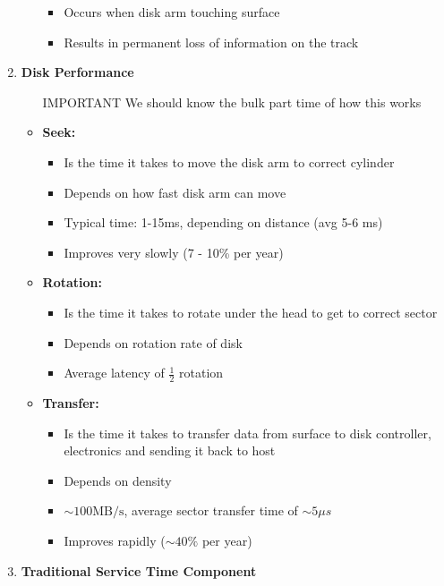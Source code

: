 \documentclass[12pt]{article}
\begin{document}
\begin{enumerate}[1.]
\begin{itemize}
        \begin{itemize}
            \item Occurs when disk arm touching surface
            \item Results in permanent loss of information on the track
        \end{itemize}
    \end{itemize}
    \item \textbf{Disk Performance}
    \begin{itemize}
        \item [\color{red}IMPORTANT\color{black}] We should know the bulk part time of how this works
        \item \textbf{Seek:}
        \begin{itemize}
            \item Is the time it takes to move the disk arm to correct cylinder
            \item Depends on how fast disk arm can move
            \item Typical time: 1-15ms, depending on distance (avg 5-6 ms)
            \item Improves very slowly (7 - 10\% per year)
        \end{itemize}
        \item \textbf{Rotation:}
        \begin{itemize}
            \item Is the time it takes to rotate under the head to get to correct sector
            \item Depends on rotation rate of disk
            \item Average latency of $\frac{1}{2}$ rotation
        \end{itemize}
        \item \textbf{Transfer:}
        \begin{itemize}
            \item Is the time it takes to transfer data from surface to disk controller, electronics
            and sending it back to host
            \item Depends on density
            \item $\sim 100 \text{MB/s}$, average sector transfer time of $\sim 5 \mu s$
            \item Improves rapidly ($\sim 40\%$ per year)
        \end{itemize}
    \end{itemize}
    \item \textbf{Traditional Service Time Component}


\end{enumerate}
\end{document}
